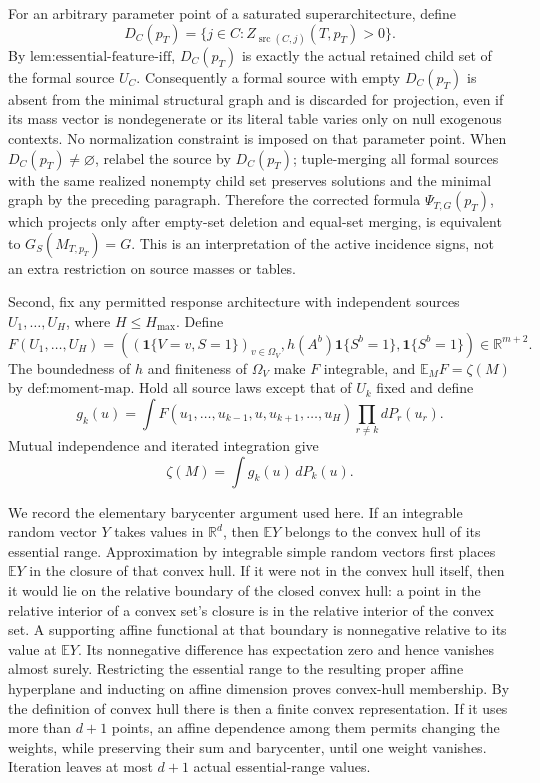 For an arbitrary parameter point of a saturated superarchitecture, define
\[
D_C(p_T)=\{j\in C:Z_{\operatorname{src}(C,j)}(T,p_T)>0\}.
\]
By \(\text{lem:essential-feature-iff}\), \(D_C(p_T)\) is exactly the actual retained child set of the formal source \(U_C\).  Consequently a formal source with empty \(D_C(p_T)\) is absent from the minimal structural graph and is discarded for projection, even if its mass vector is nondegenerate or its literal table varies only on null exogenous contexts.  No normalization constraint is imposed on that parameter point.  When \(D_C(p_T)\ne\varnothing\), relabel the source by \(D_C(p_T)\); tuple-merging all formal sources with the same realized nonempty child set preserves solutions and the minimal graph by the preceding paragraph.  Therefore the corrected formula \(\Psi_{T,G}(p_T)\), which projects only after empty-set deletion and equal-set merging, is equivalent to \(G_S(M_{T,p_T})=G\).  This is an interpretation of the active incidence signs, not an extra restriction on source masses or tables.

Second, fix any permitted response architecture with independent sources \(U_1,\ldots,U_H\), where \(H\leq H_{\max}\).  Define
\[
F(U_1,\ldots,U_H)=
\left(
  (\mathbf 1\{V=v,S=1\})_{v\in\Omega_V},
  h(A^b)\mathbf 1\{S^b=1\},
  \mathbf 1\{S^b=1\}
\right)\in\mathbb R^{m+2}.
\]
The boundedness of \(h\) and finiteness of \(\Omega_V\) make \(F\) integrable, and \(\mathbb E_M F=\zeta(M)\) by \(\text{def:moment-map}\).  Hold all source laws except that of \(U_k\) fixed and define
\[
g_k(u)=
\int F(u_1,\ldots,u_{k-1},u,u_{k+1},\ldots,u_H)
      \prod_{r\ne k}dP_r(u_r).
\]
Mutual independence and iterated integration give
\[
\zeta(M)=\int g_k(u)\,dP_k(u).
\]

We record the elementary barycenter argument used here.  If an integrable random vector \(Y\) takes values in \(\mathbb R^d\), then \(\mathbb EY\) belongs to the convex hull of its essential range.  Approximation by integrable simple random vectors first places \(\mathbb EY\) in the closure of that convex hull.  If it were not in the convex hull itself, then it would lie on the relative boundary of the closed convex hull: a point in the relative interior of a convex set's closure is in the relative interior of the convex set.  A supporting affine functional at that boundary is nonnegative relative to its value at \(\mathbb EY\).  Its nonnegative difference has expectation zero and hence vanishes almost surely.  Restricting the essential range to the resulting proper affine hyperplane and inducting on affine dimension proves convex-hull membership.  By the definition of convex hull there is then a finite convex representation.  If it uses more than \(d+1\) points, an affine dependence among them permits changing the weights, while preserving their sum and barycenter, until one weight vanishes.  Iteration leaves at most \(d+1\) actual essential-range values.

